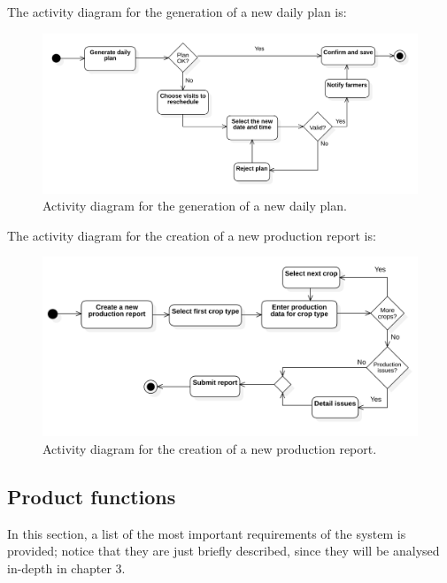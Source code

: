 \documentclass{article}
\begin{document}
The activity diagram for the generation of a new daily plan is:
\begin{figure}[H]
    \centering
	\includegraphics[scale=0.35]{state_machine_diagrams/statediagram2.png}
    \caption{Activity diagram for the generation of a new daily plan.}
\end{figure}
The activity diagram for the creation of a new production report is:
\begin{figure}[H]
    \centering
	\includegraphics[scale=0.35]{state_machine_diagrams/statediagram3.png}
    \caption{Activity diagram for the creation of a new production report.}
\end{figure}
\subsection{Product functions} \label{Product functions}
In this section, a list of the most important requirements of the system is provided; notice 
that they are just briefly described, since they will be analysed in-depth in chapter 3.
\end{document}
